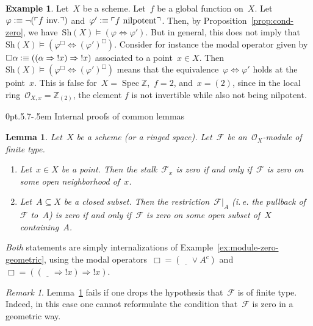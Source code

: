 \documentclass[10pt,reqno,a4paper]{amsbook}
\makeatletter
\theoremstyle{definition}
\newtheorem{ex}[defn]{Example}
\theoremstyle{plain}
\newtheorem{lemma}[defn]{Lemma}
\theoremstyle{remark}
\newtheorem{rem}[defn]{Remark}
\newcommand{\ZZ}{\mathbb{Z}}
\newcommand{\F}{\mathcal{F}}
\renewcommand{\O}{\mathcal{O}}
\newcommand{\placeholder}{\underline{\quad}}
\newcommand{\Sh}{\mathrm{Sh}}
\DeclareMathOperator{\Spec}{Spec}
\newcommand{\?}{\,{:}\,}
\renewcommand{\_}{\mathpunct{.}\,}
\newcommand{\speak}[1]{\ulcorner\text{\textnormal{#1}}\urcorner}
\newcommand{\notat}[1]{{!#1}}
\newcommand{\ie}{i.\,e.\@\xspace}
\newcommand{\inv}{inv.\@}
\newcommand{\defequiv}{\vcentcolon\equiv}
\renewenvironment{proof}[1][\proofname]{\par
  \pushQED{\qed}%
  \normalfont \topsep6\p@\@plus6\p@\relax
  \trivlist
  \item[\hskip\labelsep
        \itshape
    #1\@addpunct{.}]\ignorespaces
}{%
  \popQED\endtrivlist\@endpefalse
}
\def\subsection{\@startsection{subsection}{2}%
  {0pt}{.5\linespacing\@plus.7\linespacing}{-.5em}%
  {\normalfont\bfseries}}
\makeatother
\begin{document}
\begin{ex}\label{ex:translation-equivalence}Let~$X$ be a scheme. Let~$f$ be a
global function on~$X$. Let~$\varphi \defequiv \neg(\speak{$f$ \inv})$
and~$\varphi' \defequiv \speak{$f$ nilpotent}$. Then, by Proposition~\ref{prop:cond-zero}, we
have~$\Sh(X) \models (\varphi \Leftrightarrow \varphi')$. But in general, this
does not imply that~$\Sh(X) \models (\varphi^\Box \Leftrightarrow
(\varphi')^\Box)$. Consider for instance the modal operator given by~$\Box\alpha
\defequiv ((\alpha \Rightarrow \notat{x}) \Rightarrow \notat{x})$ associated to a
point~$x \in X$. Then~$\Sh(X) \models (\varphi^\Box \Leftrightarrow
(\varphi')^\Box)$ means that the equivalence~$\varphi \Leftrightarrow \varphi'$
holds at the point~$x$. This is false for~$X = \Spec \ZZ$,~$f = 2$, and~$x =
(2)$, since in the local ring~$\O_{X,x} = \ZZ_{(2)}$, the element $f$ is not invertible
while also not being nilpotent.
\end{ex}


\subsection{Internal proofs of common lemmas}

\begin{lemma}\label{lemma:module-zero-point-neighbourhood}
Let~$X$ be a scheme (or a ringed space). Let~$\F$ be an~$\O_X$-module
of finite type.
\begin{enumerate}
\item Let~$x \in X$ be a point. Then the stalk~$\F_x$ is zero if and
only if~$\F$ is zero on some open neighborhood of~$x$.
\item Let~$A \subseteq X$ be a closed subset. Then the restriction~$\F|_A$ (\ie
the pullback of~$\F$ to~$A$) is zero if and only if~$\F$ is zero on some open
subset of~$X$ containing~$A$.
\end{enumerate}
\end{lemma}
\begin{proof}\emph{Both} statements are simply internalizations of
Example~\ref{ex:module-zero-geometric}, using the modal operators~$\Box =
(\placeholder \vee A^c)$ and~$\Box = ((\placeholder \Rightarrow
\notat{x}) \Rightarrow \notat{x})$.
\end{proof}

\begin{rem}Lemma~\ref{lemma:module-zero-point-neighbourhood} fails if one drops the hypothesis
that~$\F$ is of finite type. Indeed, in this case one cannot reformulate the
condition that~$\F$ is zero in a geometric way.\end{rem}
\end{document}
